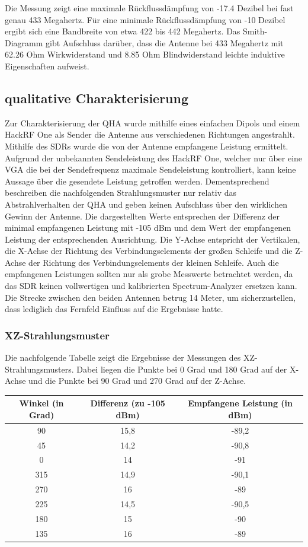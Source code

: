 Die Messung zeigt eine maximale Rückflussdämpfung von -17.4 Dezibel bei fast genau 433 Megahertz. Für eine minimale Rückflussdämpfung von -10 Dezibel ergibt sich eine Bandbreite von etwa 422 bis 442 Megahertz. Das Smith-Diagramm gibt Aufschluss darüber, dass die Antenne bei 433 Megahertz mit 62.26 Ohm Wirkwiderstand und 8.85 Ohm Blindwiderstand leichte induktive Eigenschaften aufweist.

\subsection{qualitative Charakterisierung}
Zur Charakterisierung der QHA wurde mithilfe eines einfachen Dipols und einem HackRF One als Sender die Antenne aus verschiedenen Richtungen angestrahlt. Mithilfe des SDRs wurde die von der Antenne empfangene Leistung ermittelt. Aufgrund der unbekannten Sendeleistung des HackRF One, welcher nur über eine VGA die bei der Sendefrequenz maximale Sendeleistung kontrolliert, kann keine Aussage über die gesendete Leistung getroffen werden. Dementsprechend beschreiben die nachfolgenden Strahlungsmuster nur relativ das Abstrahlverhalten der QHA und geben keinen Aufschluss über den wirklichen Gewinn der Antenne. Die dargestellten Werte entsprechen der Differenz der minimal empfangenen Leistung mit -105 dBm und dem Wert der empfangenen Leistung der entsprechenden Ausrichtung. Die Y-Achse entspricht der Vertikalen, die X-Achse der Richtung des Verbindungselements der großen Schleife und die Z-Achse der Richtung des Verbindungselements der kleinen Schleife. Auch die empfangenen Leistungen sollten nur als grobe Messwerte betrachtet werden, da das SDR keinen vollwertigen und kalibrierten Spectrum-Analyzer ersetzen kann. Die Strecke zwischen den beiden Antennen betrug 14 Meter, um sicherzustellen, dass lediglich das Fernfeld Einfluss auf die Ergebnisse hatte.

\subsubsection{XZ-Strahlungsmuster}
Die nachfolgende Tabelle zeigt die Ergebnisse der Messungen des XZ-Strahlungsmusters. Dabei liegen die Punkte bei 0 Grad und 180 Grad auf der X-Achse und die Punkte bei 90 Grad und 270 Grad auf der Z-Achse.

\begin{tabular}{|c|c|c|}
	\hline
	\textbf{Winkel (in Grad)} & \textbf{Differenz (zu -105 dBm)} & \textbf{Empfangene Leistung (in dBm)} \\
	\hline
	90 & 15,8 & -89,2 \\
	\hline
	45 & 14,2 & -90,8 \\
	\hline
	0 & 14 & -91 \\
	\hline
	315 & 14,9 & -90,1 \\
	\hline
	270 & 16 & -89 \\
	\hline
	225 & 14,5 & -90,5 \\
	\hline
	180 & 15 & -90 \\
	\hline
	135 & 16 & -89 \\
	\hline
\end{tabular}

